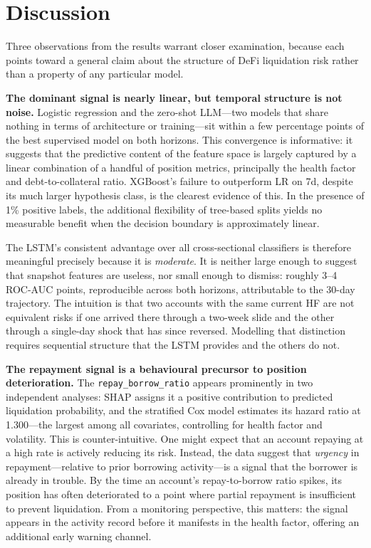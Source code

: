 \documentclass[12pt,a4paper]{article}
\begin{document}
\clearpage

\section{Discussion}
\label{sec:discussion}

Three observations from the results warrant closer examination, because
each points toward a general claim about the structure of DeFi liquidation
risk rather than a property of any particular model.

\textbf{The dominant signal is nearly linear, but temporal structure is
not noise.}
Logistic regression and the zero-shot LLM---two models that share nothing
in terms of architecture or training---sit within a few percentage points
of the best supervised model on both horizons.  This convergence is
informative: it suggests that the predictive content of the feature space
is largely captured by a linear combination of a handful of position
metrics, principally the health factor and debt-to-collateral ratio.
XGBoost's failure to outperform LR on 7d, despite its much larger
hypothesis class, is the clearest evidence of this.  In the presence of
1\% positive labels, the additional flexibility of tree-based splits
yields no measurable benefit when the decision boundary is approximately
linear.

The LSTM's consistent advantage over all cross-sectional classifiers is
therefore meaningful precisely because it is \emph{moderate}.  It is
neither large enough to suggest that snapshot features are useless, nor
small enough to dismiss: roughly 3--4 ROC-AUC points, reproducible across
both horizons, attributable to the 30-day trajectory.  The intuition is
that two accounts with the same current HF are not equivalent risks if one
arrived there through a two-week slide and the other through a single-day
shock that has since reversed.  Modelling that distinction requires
sequential structure that the LSTM provides and the others do not.

\textbf{The repayment signal is a behavioural precursor to position
deterioration.}
The \texttt{repay\_borrow\_ratio} appears prominently in two independent
analyses: SHAP assigns it a positive contribution to predicted liquidation
probability, and the stratified Cox model estimates its hazard ratio at
1.300---the largest among all covariates, controlling for health factor
and volatility.  This is counter-intuitive.  One might expect that an
account repaying at a high rate is actively reducing its risk.  Instead,
the data suggest that \emph{urgency} in repayment---relative to prior
borrowing activity---is a signal that the borrower is already in trouble.
By the time an account's repay-to-borrow ratio spikes, its position has
often deteriorated to a point where partial repayment is insufficient to
prevent liquidation.  From a monitoring perspective, this matters: the
signal appears in the activity record before it manifests in the health
factor, offering an additional early warning channel.
\end{document}
